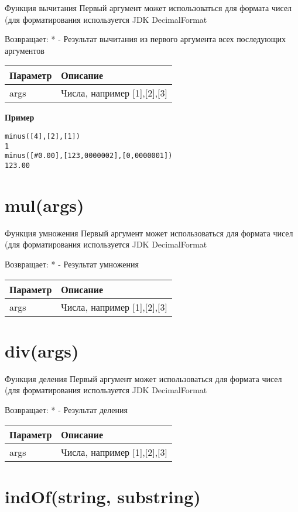 Функция вычитания Первый аргумент может использоваться для формата чисел
(для форматирования используется JDK
DecimalFormat

Возвращает: * - Результат вычитания из первого аргумента всех
последующих аргументов

\begin{longtable}[]{@{}ll@{}}
\toprule
Параметр & Описание\tabularnewline
\midrule
\endhead
args & Числа, например {[}1{]},{[}2{]},{[}3{]}\tabularnewline
\bottomrule
\end{longtable}

\textbf{Пример}

\begin{verbatim}
minus([4],[2],[1])
1
minus([#0.00],[123,0000002],[0,0000001])
123.00
\end{verbatim}

\hypertarget{mulargs}{%
\section{mul(args)}\label{mulargs}}

Функция умножения Первый аргумент может использоваться для формата чисел
(для форматирования используется JDK
DecimalFormat

Возвращает: * - Результат умножения

\begin{longtable}[]{@{}ll@{}}
\toprule
Параметр & Описание\tabularnewline
\midrule
\endhead
args & Числа, например {[}1{]},{[}2{]},{[}3{]}\tabularnewline
\bottomrule
\end{longtable}

\hypertarget{divargs}{%
\section{div(args)}\label{divargs}}

Функция деления Первый аргумент может использоваться для формата чисел
(для форматирования используется JDK
DecimalFormat

Возвращает: * - Результат деления

\begin{longtable}[]{@{}ll@{}}
\toprule
Параметр & Описание\tabularnewline
\midrule
\endhead
args & Числа, например {[}1{]},{[}2{]},{[}3{]}\tabularnewline
\bottomrule
\end{longtable}

\hypertarget{indofstring-substring-number}{%
\section{indOf(string, substring)}\label{indofstring-substring-number}}


